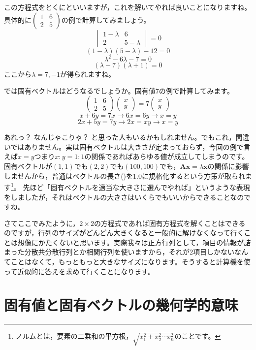 \documentclass{ltjsbook}
\begin{document}
この方程式をとくにといいますが，これを解いてやれば良いことになりますね。具体的に$\begin{pmatrix}1&6\\2&5\end{pmatrix}$の例で計算してみましょう。
\[ \begin{vmatrix}1-\lambda & 6 \\ 2 & 5-\lambda\end{vmatrix}=0\]
\[ (1-\lambda)(5-\lambda) - 12 = 0 \]
\[ \lambda^2 - 6\lambda -7 = 0 \]
\[ (\lambda-7)(\lambda+1)=0\]
ここから$\lambda=7,-1$が得られますね。

では固有ベクトルはどうなるでしょうか。固有値7の例で計算してみます。
\[ \begin{pmatrix} 1 & 6 \\ 2 & 5 \end{pmatrix}\begin{pmatrix} x\\y\end{pmatrix} = 7 \begin{pmatrix} x\\y\end{pmatrix} \]
\[ x + 6y = 7x \to 6x = 6y \to x=y \]
\[ 2x+5y = 7y \to 2x = xy \to x=y \]

あれっ？ なんじゃこりゃ？ と思った人もいるかもしれません。でもこれ，間違いではありません。実は固有ベクトルは大きさが定まっておらず，今回の例で言えば$x=y$つまり$x:y=1:1$の関係であればあらゆる値が成立してしまうのです。
固有ベクトルが$(1,1)$でも$(2,2)$でも$(100,100)$でも，$\bm{Ax}=\lambda \bm{x}$の関係に影響しませんから，普通はベクトルの長さ()を1.0に規格化するという方策が取られます\footnote{ノルムとは，要素の二乗和の平方根，$\sqrt{x_1^2 + x_2^2 \cdots x_n^2}$のことです。}。
先ほど「固有ベクトルを適当な大きさに選んでやれば」というような表現をしましたが，それはベクトルの大きさはいくらでもいいからできることなのですね。

さてここでみたように，$2\times2$の方程式であれば固有方程式を解くことはできるのですが，行列のサイズがどんどん大きくなると一般的に解けなくなって行くことは想像にかたくないと思います。実際我々は正方行列として，項目の情報が詰まった分散共分散行列とか相関行列を使いますから，それが2項目しかないなんてことはなくて，もっともっと大きなサイズになります。そうすると計算機を使って近似的に答えを求めて行くことになります。

\section{固有値と固有ベクトルの幾何学的意味}
\end{document}
